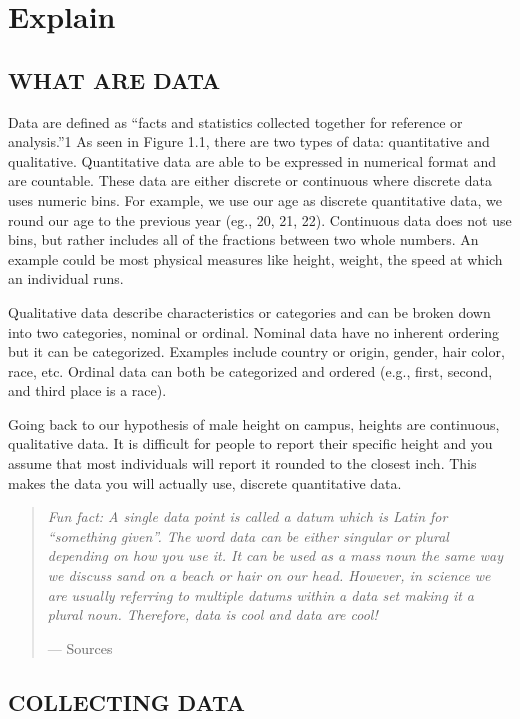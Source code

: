 \documentclass[
]{book}
\begin{document}
\hypertarget{explain}{%
\section{Explain}\label{explain}}

\hypertarget{what-are-data}{%
\subsection{WHAT ARE DATA}\label{what-are-data}}

Data are defined as ``facts and statistics collected together for reference or analysis.''1 As seen in Figure 1.1, there are two types of data: quantitative and qualitative. Quantitative data are able to be expressed in numerical format and are countable. These data are either discrete or continuous where discrete data uses numeric bins. For example, we use our age as discrete quantitative data, we round our age to the previous year (eg., 20, 21, 22). Continuous data does not use bins, but rather includes all of the fractions between two whole numbers. An example could be most physical measures like height, weight, the speed at which an individual runs.

Qualitative data describe characteristics or categories and can be broken down into two categories, nominal or ordinal. Nominal data have no inherent ordering but it can be categorized. Examples include country or origin, gender, hair color, race, etc. Ordinal data can both be categorized and ordered (e.g., first, second, and third place is a race).

Going back to our hypothesis of male height on campus, heights are continuous, qualitative data.
It is difficult for people to report their specific height and you assume that most individuals will report it rounded to the closest inch.
This makes the data you will actually use, discrete quantitative data.

\begin{quote}
\emph{Fun fact: A single data point is called a datum which is Latin for ``something given''. The word data can be either singular or plural depending on how you use it. It can be used as a mass noun the same way we discuss sand on a beach or hair on our head. However, in science we are usually referring to multiple datums within a data set making it a plural noun. Therefore, data is cool and data are cool!}

--- Sources
\end{quote}

\hypertarget{collecting-data}{%
\subsection{COLLECTING DATA}\label{collecting-data}}
\end{document}
